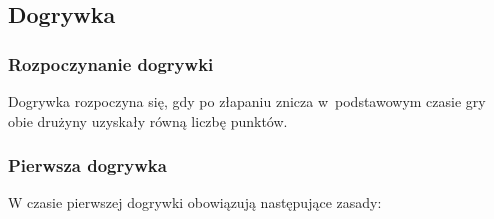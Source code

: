 \documentclass[12pt,a4paper]{article}
\begin{document}
\subsection{Dogrywka}

\subsubsection{Rozpoczynanie dogrywki}
Dogrywka rozpoczyna się, gdy
po złapaniu znicza w~podstawowym czasie gry obie drużyny uzyskały równą
liczbę punktów.

\subsubsection{Pierwsza dogrywka}
W czasie pierwszej dogrywki
obowiązują następujące zasady:
\end{document}
